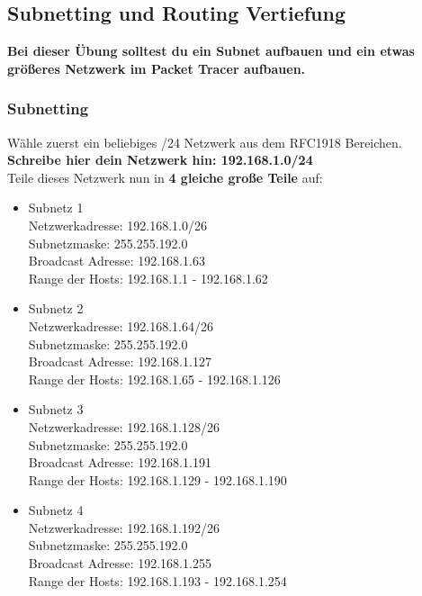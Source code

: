 \documentclass{article}
\begin{document}
	\subsection{Subnetting und Routing Vertiefung}
	\textbf{Bei dieser Übung solltest du ein Subnet aufbauen und ein etwas größeres Netzwerk im Packet Tracer aufbauen.}
	\subsubsection{Subnetting}
	Wähle zuerst ein beliebiges /24 Netzwerk aus dem RFC1918 Bereichen. \\
	\textbf{Schreibe hier dein Netzwerk hin: 192.168.1.0/24} \\
	Teile dieses Netzwerk nun in \textbf{4 gleiche große Teile} auf: \\
	\begin{itemize}
		\item{Subnetz 1 \\ 
					Netzwerkadresse: 192.168.1.0/26 \\ 
					Subnetzmaske: 255.255.192.0 \\ 
					Broadcast Adresse: 192.168.1.63 \\
					Range der Hosts: 192.168.1.1 - 192.168.1.62}
		\item{Subnetz 2 \\ 
					Netzwerkadresse: 192.168.1.64/26 \\ 
					Subnetzmaske: 255.255.192.0 \\ 
					Broadcast Adresse: 192.168.1.127 \\
					Range der Hosts: 192.168.1.65 - 192.168.1.126}
		\item{Subnetz 3 \\ 
					Netzwerkadresse: 192.168.1.128/26 \\ 
					Subnetzmaske: 255.255.192.0 \\ 
					Broadcast Adresse: 192.168.1.191 \\
					Range der Hosts: 192.168.1.129 - 192.168.1.190}
		\item{Subnetz 4 \\ 
					Netzwerkadresse: 192.168.1.192/26 \\ 
					Subnetzmaske: 255.255.192.0 \\ 
					Broadcast Adresse: 192.168.1.255 \\
					Range der Hosts: 192.168.1.193 - 192.168.1.254}
	\end{itemize}
\end{document}
